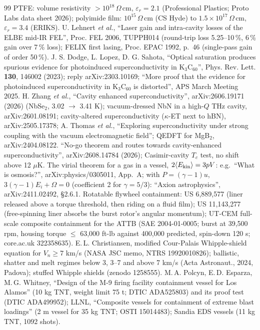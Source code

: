 \begin{thebibliography}{99}
 PTFE: volume resistivity $>10^{18}\,\Omega$\,cm, $\varepsilon_r=2.1$ (Professional Plastics; Proto Labs data sheet 2026); polyimide film: $10^{15}\,\Omega$\,cm (CS Hyde) to $1.5\times10^{17}\,\Omega$\,cm, $\varepsilon_r=3.4$ (ERIKS).
 U. Lehnert \emph{et al.}, ``Laser gain and intra-cavity losses of the ELBE mid-IR FEL'', Proc. FEL 2006, TUPPH014 (round-trip loss 5.25--10\,\%, 6\,\% gain over 7\,\% loss); FELIX first lasing, Proc. EPAC 1992, p.~46 (single-pass gain of order 50\,\%).
 J. S. Dodge, L. Lopez, D. G. Sahota, ``Optical saturation produces spurious evidence for photoinduced superconductivity in K$_3$C$_{60}$'', Phys. Rev. Lett. \textbf{130}, 146002 (2023); reply arXiv:2303.10169; ``More proof that the evidence for photoinduced superconductivity in K$_3$C$_{60}$ is distorted'', APS March Meeting 2025.
 H. Zhang \emph{et al.}, ``Cavity enhanced superconductivity'', arXiv:2606.19171 (2026) (NbSe$_2$, 3.02 $\to$ 3.41 K); vacuum-dressed NbN in a high-$Q$ THz cavity, arXiv:2601.08191; cavity-altered superconductivity ($\kappa$-ET next to hBN), arXiv:2505.17378; A. Thomas \emph{et al.}, ``Exploring superconductivity under strong coupling with the vacuum electromagnetic field''; QEDFT for MgB$_2$, arXiv:2404.08122.
 ``No-go theorem and routes towards cavity-enhanced superconductivity'', arXiv:2608.14784 (2026); Casimir-cavity $T_c$ test, no shift above 12 $\mu$K.
 The virial theorem for a gas in a vessel, $2\langle E_{\rm kin}\rangle=3pV$: e.g.\ ``What is osmosis?'', arXiv:physics/0305011, App.~A; with $P=(\gamma-1)u$, $3(\gamma-1)E_i+\Omega=0$ (coefficient 2 for $\gamma=5/3$): ``Axion astrophysics'', arXiv:2411.02492, \S2.6.1.
 Rotatable flywheel containment: US 6,889,577 (liner released above a torque threshold, then riding on a fluid film); US 11,143,277 (free-spinning liner absorbs the burst rotor's angular momentum); UT-CEM full-scale composite containment for the ATTB (SAE 2004-01-0005; burst at 39,500 rpm, housing torque $\le$ 63,000 ft-lb against 400,000 predicted, spin-down 120 s; core.ac.uk 322358635).
 E.\,L. Christiansen, modified Cour-Palais Whipple-shield equation for $V_n\ge7$ km/s (NASA JSC memo, NTRS 19920010826); ballistic, shatter and melt regimes below 3, 3--7 and above 7 km/s (Acta Astronaut., 2024, Padova); stuffed Whipple shields (zenodo 1258555).
 M.\,A. Polcyn, E.\,D. Esparza, M.\,G. Whitney, ``Design of the M-9 firing facility containment vessel for Los Alamos'' (10 kg TNT, weight limit 75 t; DTIC ADA525803) and its proof test (DTIC ADA499952); LLNL, ``Composite vessels for containment of extreme blast loadings'' (2 m vessel for 35 kg TNT; OSTI 15014483); Sandia EDS vessels (11 kg TNT, 1092 shots).

\end{thebibliography}
